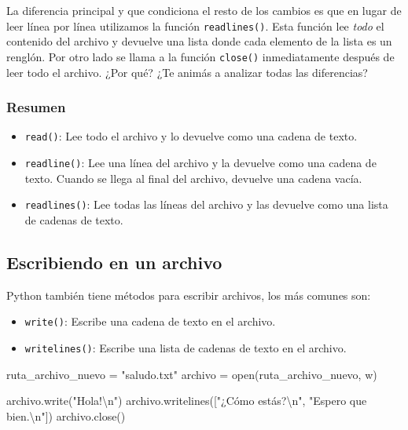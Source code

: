\documentclass[
  letterpaper,
  DIV=11,
  numbers=noendperiod]{scrreprt}
\newenvironment{Shaded}{\begin{snugshade}}{\end{snugshade}}
\newcommand{\BuiltInTok}[1]{\textcolor[rgb]{0.00,0.23,0.31}{#1}}
\newcommand{\CharTok}[1]{\textcolor[rgb]{0.13,0.47,0.30}{#1}}
\newcommand{\NormalTok}[1]{\textcolor[rgb]{0.00,0.23,0.31}{#1}}
\newcommand{\OperatorTok}[1]{\textcolor[rgb]{0.37,0.37,0.37}{#1}}
\newcommand{\StringTok}[1]{\textcolor[rgb]{0.13,0.47,0.30}{#1}}
\providecommand{\tightlist}{%
  \setlength{\itemsep}{0pt}\setlength{\parskip}{0pt}}\usepackage{longtable,booktabs,array}
\begin{document}
La diferencia principal y que condiciona el resto de los cambios es que
en lugar de leer línea por línea utilizamos la función
\texttt{readlines()}. Esta función lee \emph{todo} el contenido del
archivo y devuelve una lista donde cada elemento de la lista es un
renglón. Por otro lado se llama a la función \texttt{close()}
inmediatamente después de leer todo el archivo. ¿Por qué? ¿Te animás a
analizar todas las diferencias?

\subsubsection{Resumen}\label{resumen}

\begin{itemize}
\tightlist
\item
  \texttt{read()}: Lee todo el archivo y lo devuelve como una cadena de
  texto.
\item
  \texttt{readline()}: Lee una línea del archivo y la devuelve como una
  cadena de texto. Cuando se llega al final del archivo, devuelve una
  cadena vacía.
\item
  \texttt{readlines()}: Lee todas las líneas del archivo y las devuelve
  como una lista de cadenas de texto.
\end{itemize}

\subsection{Escribiendo en un archivo}\label{escribiendo-en-un-archivo}

Python también tiene métodos para escribir archivos, los más comunes
son:

\begin{itemize}
\tightlist
\item
  \texttt{write()}: Escribe una cadena de texto en el archivo.
\item
  \texttt{writelines()}: Escribe una lista de cadenas de texto en el
  archivo.
\end{itemize}

\begin{Shaded}
\begin{Highlighting}[]
\NormalTok{ruta\_archivo\_nuevo }\OperatorTok{=} \StringTok{"saludo.txt"}
\NormalTok{archivo }\OperatorTok{=} \BuiltInTok{open}\NormalTok{(ruta\_archivo\_nuevo, }\StringTok{\textquotesingle{}w\textquotesingle{}}\NormalTok{)}

\NormalTok{archivo.write(}\StringTok{"Hola!}\CharTok{\textbackslash{}n}\StringTok{"}\NormalTok{)}
\NormalTok{archivo.writelines([}\StringTok{"¿Cómo estás?}\CharTok{\textbackslash{}n}\StringTok{"}\NormalTok{, }\StringTok{"Espero que bien.}\CharTok{\textbackslash{}n}\StringTok{"}\NormalTok{])}
\NormalTok{archivo.close()}
\end{Highlighting}
\end{Shaded}
\end{document}
